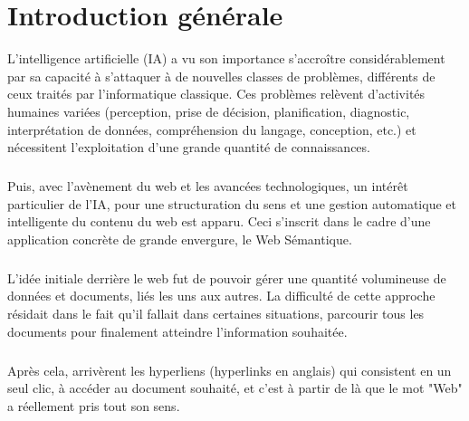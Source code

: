 \documentclass[12pt, a4paper, oneside]{book}
\begin{document}
\frontmatter
\listoffigures
\tableofcontents

\mainmatter

\chapter{Introduction générale}

L'intelligence artificielle (IA) a vu son importance s'accroître considérablement
par sa capacité à s'attaquer à de nouvelles classes de problèmes, différents de ceux
traités par l'informatique classique. Ces problèmes relèvent d'activités humaines
variées (perception, prise de décision, planification, diagnostic, interprétation de
données, compréhension du langage, conception, etc.) et nécessitent l'exploitation d'une grande quantité de connaissances.\citep{IA}

\paragraph{}

Puis, avec l'avènement du web et les avancées technologiques, un intérêt
particulier de l'IA, pour une structuration du sens et une gestion automatique et
intelligente du contenu du web est apparu. Ceci s'inscrit dans le cadre d'une
application concrète de grande envergure, le Web Sémantique. \citep{avenement}

\paragraph{}

L'idée initiale derrière le web fut de pouvoir gérer une quantité volumineuse de données et documents, liés les uns aux autres. La difficulté de cette approche résidait dans le fait qu'il fallait dans certaines situations, parcourir tous les documents pour finalement atteindre l'information souhaitée.



\paragraph{}

Après cela, arrivèrent les hyperliens (hyperlinks en anglais) qui consistent en un seul clic, à accéder 
au document souhaité, et c'est à partir de là que le mot "Web" a réellement pris tout son sens.



\paragraph{}
\end{document}
